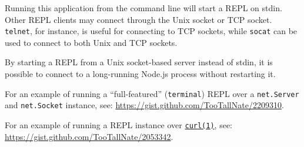 Running this application from the command line will start a REPL on
stdin. Other REPL clients may connect through the Unix socket or TCP
socket. \texttt{telnet}, for instance, is useful for connecting to TCP
sockets, while \texttt{socat} can be used to connect to both Unix and
TCP sockets.

By starting a REPL from a Unix socket-based server instead of stdin, it
is possible to connect to a long-running Node.js process without
restarting it.

For an example of running a ``full-featured'' (\texttt{terminal}) REPL
over a \texttt{net.Server} and \texttt{net.Socket} instance, see:
\url{https://gist.github.com/TooTallNate/2209310}.

For an example of running a REPL instance over
\href{https://curl.haxx.se/docs/manpage.html}{\texttt{curl(1)}}, see:
\url{https://gist.github.com/TooTallNate/2053342}.
